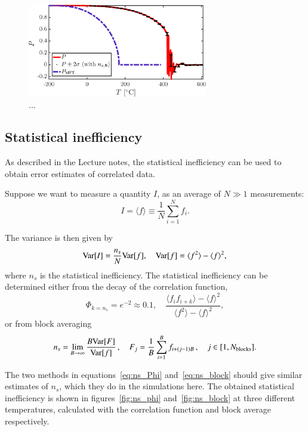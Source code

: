 \begin{figure}[!ht]
\begin{center}
  \includegraphics[width=0.7\textwidth]{../figures/P} 
  \caption{... }
  \label{fig:P}
\end{center}
\end{figure}


\subsection*{Statistical inefficiency}
As described in the Lecture notes, the statistical inefficiency can be used to obtain error estimates of correlated data. 

Suppose we want to measure a quantity $I$, as an average of $N\gg1$ measurements: 
\begin{equation}
I = \langle f \rangle \equiv \frac{1}{N}\sum_{i = 1}^N f_i.
\end{equation}

The variance is then given by 
\begin{equation}
{\rm Var}[I] = \frac{n_s}{N}{\rm Var}[f], \quad {\rm Var}[f] = \langle f^2 \rangle - \langle f \rangle^2,
\end{equation}
where $n_s$ is the statistical inefficiency. 
The statistical inefficiency can be determined either from the decay of the correlation function, 
\begin{equation}
\Phi_{k = n_s} = e^{-2} \approx 0.1, \quad \frac{\langle f_i f_{i+k}\rangle - \langle f \rangle^2}{\langle f^2\rangle - \langle f \rangle^2},
\label{eq:ns_Phi}
\end{equation}
or from block averaging
\begin{equation}
n_s = \lim_{B \rightarrow \infty} \frac{B {\rm Var}[F]}{{\rm Var}[f]}\,, \quad F_j = \frac{1}{B}\sum_{i = 1}^B f_{i + (j-1)B}\,, \quad j \in [1, N_{\rm blocks} ].
\label{eq:ns_block}
\end{equation}

The two methods in equations~\eqref{eq:ns_Phi} and~\eqref{eq:ns_block} should give similar estimates of $n_s$, which they do in the simulations here. The obtained statistical inefficiency is shown in figures~\ref{fig:ns_phi} and~\ref{fig:ns_block}   at three different temperatures, calculated with the correlation function and block average respectively. 

